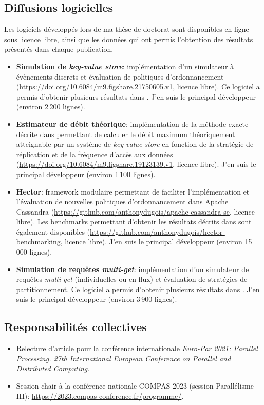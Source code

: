 \documentclass[12pt]{article}
\begin{document}
\subsection{Diffusions logicielles}

Les logiciels développés lors de ma thèse de doctorat sont disponibles en ligne sous licence libre,
ainsi que les données qui ont permis l'obtention des résultats présentés dans chaque publication.

\begin{itemize}
    \item \textbf{Simulation de \emph{key-value store}}: implémentation d'un simulateur à évènements
    discrets et évaluation de politiques d'ordonnancement
    (\url{https://doi.org/10.6084/m9.figshare.21750605.v1}, licence libre). Ce logiciel a permis
    d'obtenir plusieurs résultats dans \cite{benmokhtar2021,benmokhtar2024}. J'en suis le
    principal développeur (environ 2\,200 lignes).
    \item \textbf{Estimateur de débit théorique}: implémentation de la méthode exacte décrite dans
    \cite{canon2022} permettant de calculer le débit maximum théoriquement atteignable par un
    système de \emph{key-value store} en fonction de la stratégie de réplication et de la fréquence
    d'accès aux données (\url{https://doi.org/10.6084/m9.figshare.19123139.v1}, licence libre). J'en
    suis le principal développeur (environ 1\,100 lignes).
    \item \textbf{Hector}: framework modulaire permettant de faciliter l'implémentation et
    l'évaluation de nouvelles politiques d'ordonnancement dans Apache Cassandra
    (\url{https://github.com/anthonydugois/apache-cassandra-se}, licence libre). Les benchmarks
    permettant d'obtenir les résultats décrits dans \cite{canon2023b} sont également disponibles
    (\url{https://github.com/anthonydugois/hector-benchmarking}, licence libre). J'en suis le
    principal développeur (environ 15\,000 lignes).
    \item \textbf{Simulation de requêtes \emph{multi-get}}: implémentation d'un simulateur de
    requêtes \emph{multi-get} (individuelles ou en flux) et évaluation de stratégies de
    partitionnement. Ce logiciel a permis d'obtenir plusieurs résultats dans \cite{canon2024}. J'en
    suis le principal développeur (environ 3\,900 lignes).
\end{itemize}

\subsection{Responsabilités collectives}

\begin{itemize}
    \item Relecture d'article pour la conférence internationale
    \emph{\foreignlanguage{english}{Euro-Par 2021: Parallel Processing. 27th International European
    Conference on Parallel and Distributed Computing}}.
    \item Session chair à la conférence nationale COMPAS 2023 (session Parallélisme III):
    \url{https://2023.compas-conference.fr/programme/}.
\end{itemize}
\end{document}

